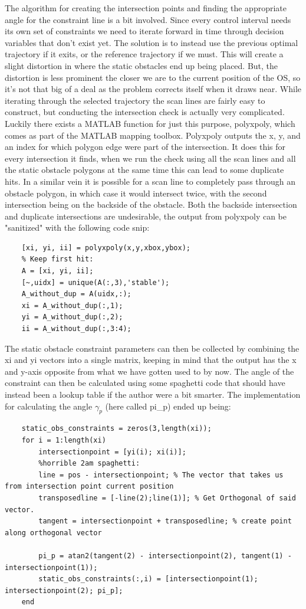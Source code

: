 The algorithm for creating the intersection points and finding the appropriate angle for the constraint line is a bit involved.
Since every control interval needs its own set of constraints we need to iterate forward in time through decision variables
that don't exist yet. The solution is to instead use the previous optimal trajectory if it exits, or the reference trajectory if we must.
This will create a slight distortion in where the static obstacles end up being placed. But, the distortion is less prominent
the closer we are to the current position of the \gls{OS}, so it's not that big of a deal as the problem corrects itself when it draws near.
While iterating through the selected trajectory the scan lines are fairly easy to construct, but conducting the intersection check is actually very complicated. Luckily
there exists a MATLAB function for just this purpose, polyxpoly, which comes as part of the MATLAB mapping toolbox. Polyxpoly outputs the x, y, 
and an index for which polygon edge were part of the intersection. It does this for every intersection it finds, when we run the check using all the scan lines
and all the static obstacle polygons at the same time this can lead to some duplicate hits. In a similar vein it is possible for a scan line to completely pass through
an obstacle polygon, in which case it would intersect twice, with the second intersection being on the backside of the obstacle. Both the backside intersection and
duplicate intersections are undesirable, the output from polyxpoly can be "sanitized" with the following code snip:
\begin{lstlisting}
    [xi, yi, ii] = polyxpoly(x,y,xbox,ybox);
    % Keep first hit:
    A = [xi, yi, ii];
    [~,uidx] = unique(A(:,3),'stable');
    A_without_dup = A(uidx,:);
    xi = A_without_dup(:,1);
    yi = A_without_dup(:,2);
    ii = A_without_dup(:,3:4);
\end{lstlisting}
The static obstacle constraint parameters can then be collected by combining the xi and yi vectors into a single matrix, keeping in mind that the output
has the x and y-axis opposite from what we have gotten used to by now. The angle of the constraint can then be calculated using some spaghetti code that should
have instead been a lookup table if the author were a bit smarter. The implementation for calculating the angle $\gamma_p$ (here called pi\_p) ended up being:
\begin{lstlisting}
    static_obs_constraints = zeros(3,length(xi));
    for i = 1:length(xi)
        intersectionpoint = [yi(i); xi(i)];
        %horrible 2am spaghetti:
        line = pos - intersectionpoint; % The vector that takes us from intersection point current position
        transposedline = [-line(2);line(1)]; % Get Orthogonal of said vector.
        tangent = intersectionpoint + transposedline; % create point along orthogonal vector
        
        pi_p = atan2(tangent(2) - intersectionpoint(2), tangent(1) - intersectionpoint(1));
        static_obs_constraints(:,i) = [intersectionpoint(1); intersectionpoint(2); pi_p];
    end 
\end{lstlisting}
